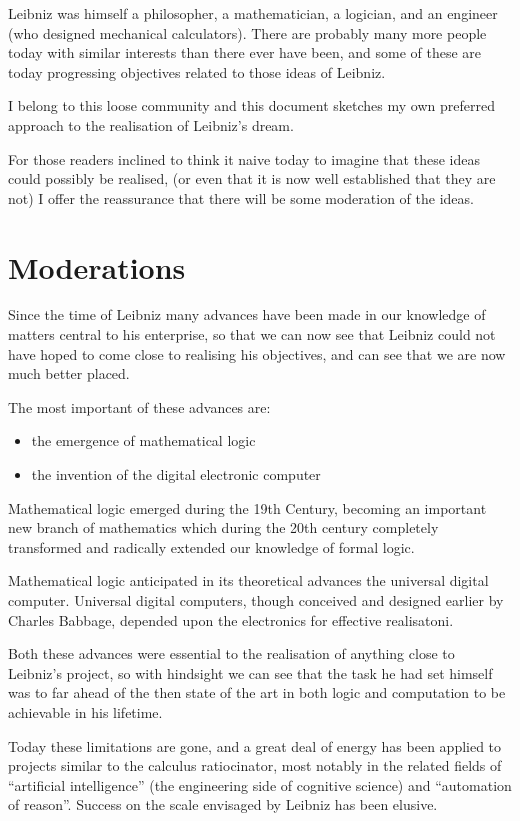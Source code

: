 \documentclass[numreferences]{rbjk}
\begin{document}
\begin{article}
Leibniz was himself a philosopher, a mathematician, a logician, and an engineer (who designed mechanical calculators).
There are probably many more people today with similar interests than there ever have been, and some of these are today progressing objectives related to those ideas of Leibniz.

I belong to this loose community and this document sketches my own preferred approach to the realisation of Leibniz's dream.

For those readers inclined to think it naive today to imagine that these ideas could possibly be realised, (or even that it is now well established that they are not) I offer the reassurance that there will be some moderation of the ideas.

\section{Moderations}

Since the time of Leibniz many advances have been made in our knowledge of matters central to his enterprise, so that we can now see that Leibniz could not have hoped to come close to realising his objectives, and can see that we are now much better placed.

The most important of these advances are:
\begin{itemize}
\item the emergence of mathematical logic
\item the invention of the digital electronic computer
\end{itemize}

Mathematical logic emerged during the 19th Century, becoming an important new branch of mathematics which during the 20th century completely transformed and radically extended our knowledge of formal logic.

Mathematical logic anticipated in its theoretical advances the universal digital computer.
Universal digital computers, though conceived and designed earlier by Charles Babbage, depended upon the electronics for effective realisatoni.

Both these advances were essential to the realisation of anything close to Leibniz's project, so with hindsight we can see that the task he had set himself was to far ahead of the then state of the art in both logic and computation to be achievable in his lifetime.

Today these limitations are gone, and a great deal of energy has been applied to projects similar to the calculus ratiocinator, most notably in the related fields of ``artificial intelligence'' (the engineering side of cognitive science) and ``automation of reason''.
Success on the scale envisaged by Leibniz has been elusive.


%
%


\end{article}
\end{document}

